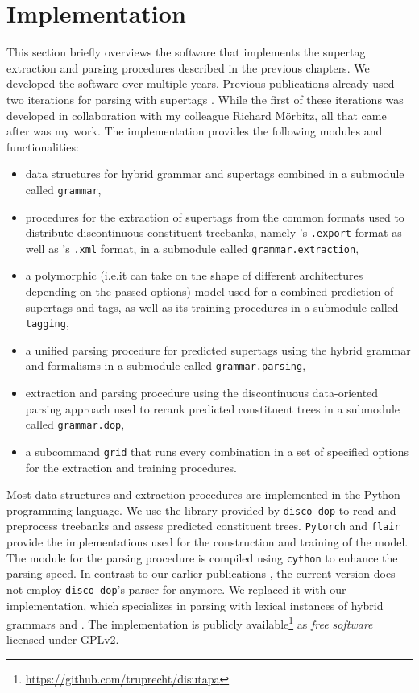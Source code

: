 \documentclass[../../document.tex]{subfiles}
\begin{document}
    \section{Implementation}\label{sec:implementation}
    This section briefly overviews the software that implements the supertag extraction and parsing procedures described in the previous chapters.
    We developed the software over multiple years. Previous publications already used two iterations for parsing with  supertags \citep{RupMoe21,Rup22}.
    While the first of these iterations was developed in collaboration with my colleague Richard Mörbitz, all that came after was my work.
    The implementation provides the following modules and functionalities:
    \begin{itemize}
        \item data structures for hybrid grammar and  supertags combined in a submodule called \texttt{grammar},
        \item procedures for the extraction of supertags from the common formats used to distribute discontinuous constituent treebanks, namely \negra{}'s \texttt{.export} format as well as \tiger{}'s \texttt{.xml} format, in a submodule called \texttt{grammar.extraction},
        \item a polymorphic (i.e.\@ it can take on the shape of different architectures depending on the passed options)  model used for a combined prediction of supertags and  tags, as well as its training procedures in a submodule called \texttt{tagging},
        \item a unified parsing procedure for predicted supertags using the hybrid grammar and  formalisms in a submodule called \texttt{grammar.parsing},
        \item extraction and parsing procedure using the discontinuous data-oriented parsing approach used to rerank predicted constituent trees in a submodule called \texttt{grammar.dop},
        \item a subcommand \texttt{grid} that runs every combination in a set of specified options for the extraction and training procedures.
    \end{itemize}

    Most data structures and extraction procedures are implemented in the Python programming language.
    We use the library provided by \texttt{disco-dop} \citep{Cra12} to read and preprocess treebanks and assess predicted constituent trees.
    \texttt{Pytorch} \citep{paszke2019pytorch} and \texttt{flair} \citep{Akb19} provide the implementations used for the construction and training of the  model.
    The module for the parsing procedure is compiled using \texttt{cython} \citep{behnel2011cython} to enhance the parsing speed.
    In contrast to our earlier publications \citep{RupMoe21,Rup22}, the current version does not employ \texttt{disco-dop}'s parser for  anymore.
    We replaced it with our implementation, which specializes in parsing with lexical instances of hybrid grammars and .
    The implementation is publicly available\footnote{\url{https://github.com/truprecht/disutapa}} as \emph{free software} licensed under GPLv2.
\end{document}

